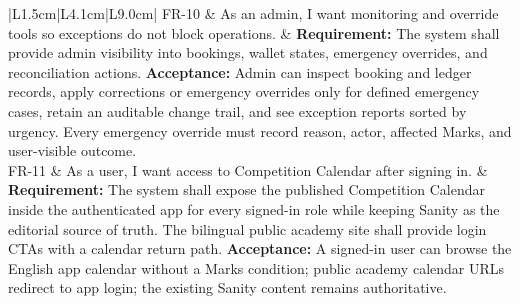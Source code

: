 \documentclass[11pt,a4paper]{article}
\begin{document}
\begin{longtable}{|L{1.5cm}|L{4.1cm}|L{9.0cm}|}
	\hline
	FR-10           & As an admin, I want monitoring and override tools so exceptions do not block operations.                               & \textbf{Requirement:} The system shall provide admin visibility into bookings, wallet states, emergency overrides, and reconciliation actions. \newline \textbf{Acceptance:} Admin can inspect booking and ledger records, apply corrections or emergency overrides only for defined emergency cases, retain an auditable change trail, and see exception reports sorted by urgency. Every emergency override must record reason, actor, affected Marks, and user-visible outcome.                                                                                                                                                                                                                                                                                        \\
	\hline
FR-11           & As a user, I want access to Competition Calendar after signing in.                                 & \textbf{Requirement:} The system shall expose the published Competition Calendar inside the authenticated app for every signed-in role while keeping Sanity as the editorial source of truth. The bilingual public academy site shall provide login CTAs with a calendar return path. \newline \textbf{Acceptance:} A signed-in user can browse the English app calendar without a Marks condition; public academy calendar URLs redirect to app login; the existing Sanity content remains authoritative.                                                                                                                                                                                                                                                                                                                                         \\
	\hline

\end{longtable}
\end{document}

